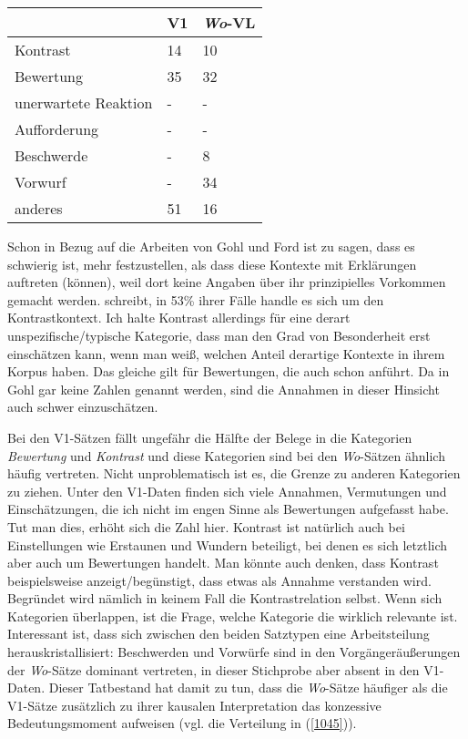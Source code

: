 {\begin{exe}
	\ex\label{1044} 
    \begin{tabular}[t]{|l|l|l|}
    \hline
	& V1 & \textit{Wo}-VL\\
	\hline
	Kontrast & 14 & 10\\
	\hline
	Bewertung & 35 & 32\\
	unerwartete Reaktion & - & -\\
	\hline
	Aufforderung & - & -\\
	\hline
	Beschwerde & - & 8\\
	\hline
	Vorwurf & - & 34\\
	\hline
	anderes & 51 & 16\\
	\hline	
    \end{tabular}   
\end{exe}
Schon in Bezug auf die Arbeiten von Gohl und Ford ist zu sagen, dass es schwierig ist, mehr festzustellen, als dass diese Kontexte mit Erklärungen  auftreten (können), weil dort keine Angaben über ihr prinzipielles Vorkommen gemacht werden. \citet[548]{Ford1993} schreibt, in 53\% ihrer Fälle handle es sich um den Kontrastkontext. Ich halte Kontrast  allerdings für eine derart unspezifische/typische Kategorie, dass man den Grad von Besonderheit erst einschätzen kann, wenn man weiß, welchen Anteil derartige Kontexte in ihrem Korpus haben. Das glei\-che gilt für Bewertungen, die \citet{Ford1993} auch schon anführt. Da in Gohl gar keine Zahlen genannt werden, sind die Annahmen in dieser Hinsicht auch schwer einzuschätzen. 

Bei den V1-Sätzen fällt ungefähr die Hälfte der Belege in die Kategorien \textit{Be\-wertung}  und \textit{Kontrast}  und diese Kategorien sind bei den \textit{Wo}-Sätzen ähnlich häufig vertreten. Nicht unproblematisch ist es, die Grenze zu anderen Kategorien zu ziehen. Unter den V1-Daten finden sich viele Annahmen, Vermutungen und Einschätzungen, die ich nicht im engen Sinne als Bewertungen aufgefasst habe. Tut man dies, erhöht sich die Zahl hier. Kontrast ist natürlich auch bei Einstellungen wie Erstaunen und Wundern beteiligt, bei denen es sich letztlich aber auch um Bewertungen handelt. Man könnte auch denken, dass Kontrast bei\-spielsweise anzeigt/begünstigt, dass etwas als Annahme verstanden wird. Begründet wird nämlich in keinem Fall die Kontrastrelation selbst. Wenn sich Kategorien überlappen, ist die Frage, welche Kategorie die wirklich relevante ist. Interessant ist, dass sich zwischen den beiden Satztypen eine Arbeitsteilung he\-rauskristallisiert: Beschwerden und Vorwürfe sind in den Vorgängeräußerungen der \textit{Wo}-Sätze dominant vertreten, in dieser Stichprobe aber absent in den V1-Daten. Dieser Tatbestand hat damit zu tun, dass die \textit{Wo}-Sätze häufiger als die V1-Sätze zusätzlich zu ihrer kausalen Interpretation das konzessive Bedeutungsmoment aufweisen (vgl. die Verteilung in (\ref{1045})).

}
